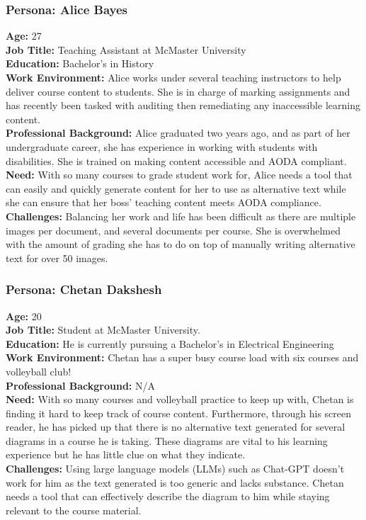 \documentclass[12pt]{article}
\begin{document}
\subsubsection*{Persona: Alice Bayes}
\textbf{Age:} 27 \\
\textbf{Job Title:} Teaching Assistant at McMaster University\\
\textbf{Education:} Bachelor's in History\\
\textbf{Work Environment:} Alice works under several teaching
instructors to help deliver course content to students. She is in
charge of marking assignments and has recently been tasked with
auditing then remediating any inaccessible learning content. \\
\textbf{Professional Background:} Alice graduated two years ago, and
as part of her undergraduate career, she has experience in working
with students with disabilities. She is trained on making content
accessible and AODA compliant.\\[2mm]
\textbf{Need:} With so many courses to grade student work for, Alice
needs a tool that can easily and quickly generate content for her to
use as alternative text while she can ensure that her boss' teaching
content meets AODA compliance.\\
\textbf{Challenges:} Balancing her work and life has been difficult
as there are multiple images per document, and several documents per
course. She is overwhelmed with the amount of grading she has to do
on top of manually writing alternative text for over 50 images.

\subsubsection*{Persona: Chetan Dakshesh}
\textbf{Age:} 20 \\
\textbf{Job Title:} Student at McMaster University.\\
\textbf{Education:} He is currently pursuing a Bachelor's in
Electrical Engineering\\
\textbf{Work Environment:} Chetan has a super busy course load with
six courses and volleyball club!\\
\textbf{Professional Background:} N/A\\[2mm]
\textbf{Need:} With so many courses and volleyball practice to keep
up with, Chetan is finding it hard to keep track of course content.
Furthermore, through his screen reader, he has picked up that there
is no alternative text generated for several diagrams in a course he
is taking. These diagrams are vital to his learning experience but he
has little clue on what they indicate. \\
\textbf{Challenges:} Using large language models (LLMs) such as
Chat-GPT doesn't work for him as the text generated is too generic
and lacks substance. Chetan needs a tool that can effectively
describe the diagram to him while staying relevant to the course material.
\end{document}
